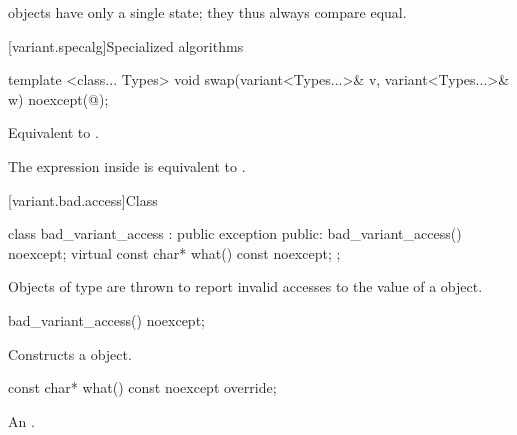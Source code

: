 \begin{itemdescr}
\pnum
\begin{note}  objects have only a single state; they thus always compare equal.\end{note}
\end{itemdescr}


[variant.specalg]{Specialized algorithms}

%
\begin{itemdecl}
template <class... Types> void swap(variant<Types...>& v, variant<Types...>& w) noexcept(@\seebelow@);
\end{itemdecl}

\begin{itemdescr}
\pnum
\effects Equivalent to .

\pnum
\remarks The expression inside  is equivalent to .
\end{itemdescr}

%
[variant.bad.access]{Class }

\begin{codeblock}
class bad_variant_access : public exception {
public:
  bad_variant_access() noexcept;
  virtual const char* what() const noexcept;
};
\end{codeblock}

\pnum
Objects of type  are thrown to report invalid
accesses to the value of a  object.

%
\begin{itemdecl}
bad_variant_access() noexcept;
\end{itemdecl}

\begin{itemdescr}
\pnum
Constructs a  object.
\end{itemdescr}

%
\begin{itemdecl}
const char* what() const noexcept override;
\end{itemdecl}

\begin{itemdescr}
\pnum
\returns An  \ntbs.
\end{itemdescr}

